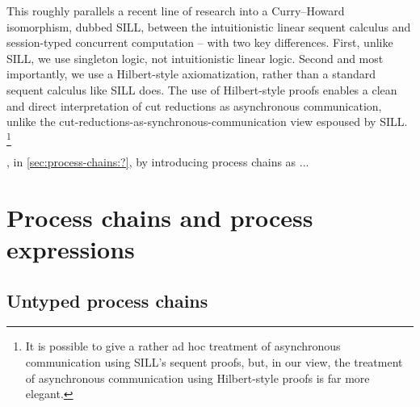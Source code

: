 This roughly parallels a recent line of research into a Curry--Howard isomorphism, dubbed SILL, between the intuitionistic linear sequent calculus and session-typed concurrent computation\autocites{Caires+:MSCS16}{Caires+:TLDI12} -- with two key differences.
First, unlike SILL, we use singleton logic, not intuitionistic linear logic.
Second and most importantly, we use a Hilbert-style axiomatization, rather than a standard sequent calculus like SILL does.
The use of Hilbert-style proofs enables a clean and direct interpretation of cut reductions as asynchronous communication, unlike the cut-reductions-as-synchronous-communication view espoused by SILL.%
\footnote{It is possible to give a rather ad hoc treatment of asynchronous communication using SILL's sequent proofs\textcite{DeYoung+:CSL12}, but, in our view, the treatment of asynchronous communication using Hilbert-style proofs is far more elegant.}







, in \cref{sec:process-chains:?}, by introducing process chains as ...


\section{Process chains and process expressions}

\subsection{Untyped process chains}

